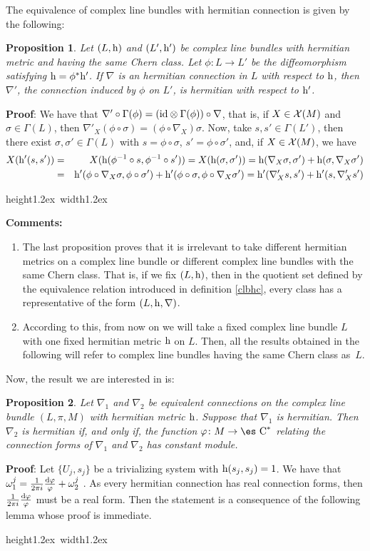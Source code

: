 \documentclass[12pt]{article}
\theoremstyle{plain}
\newtheorem{prop}{Proposition}
\def\beann{\begin{eqnarray*}}
\def\eeann{\end{eqnarray*}}
\def\dst{\(}
\def\qed{\ifvmode\removelastskip\fi
{\unskip\nobreak\hfil\penalty50\hbox{}\nobreak\hfil
\hbox{\vrule height1.2ex width1.2ex}\parfillskip=0pt
\finalhyphendemerits=0 \par\smallskip}}
\def\d{{\rm d}}
\def\h{{\rm h}}
\def\Complex{\mbox{\es C}}
\begin{document}
The equivalence of complex line bundles with
hermitian connection is given by the following:

\begin{prop}
Let $(L,\h )$ and $(L',\h ')$ be complex line bundles
with hermitian metric and having the same Chern class.
Let $\phi \colon L \to L'$ be the diffeomorphism
satisfying $\h = \phi^*\h '$.
If $\nabla$ is an hermitian connection in $L$ with
respect to $\h$, then $\nabla '$,
the connection induced by $\phi$ on $L'$,
is hermitian with respect to $\h '$.
\label{llprim}
\end{prop}
{\bf Proof}: 
We have that
$\nabla ' \circ \Gamma (\phi ) =
({\rm id} \otimes \Gamma (\phi )) \circ \nabla$,
that is, if $X \in {\cal X}(M)$ and
$\sigma \in \Gamma (L)$, then
$\nabla '_X (\phi \circ \sigma ) = (\phi \circ \nabla_X)\sigma$.
Now, take $s,s' \in \Gamma (L')$,
then there exist $\sigma ,\sigma ' \in \Gamma (L)$
with $s = \phi \circ \sigma$,
$s' = \phi \circ \sigma '$,
and, if $X \in {\cal X}(M)$, we have
\beann
X(\h '(s,s'))
&=&
X(\h (\phi^{-1} \circ s,\phi^{-1} \circ s')) =
X(\h (\sigma ,\sigma '))=
\h (\nabla_X \sigma ,\sigma ') + \h (\sigma ,\nabla_X \sigma ')
\\
&=&
\h '(\phi \circ \nabla_X \sigma ,\phi \circ \sigma ') +
\h '(\phi \circ \sigma ,\phi \circ \nabla_X \sigma ')=
\h '(\nabla '_X s,s') + \h '(s,\nabla '_X s')
\eeann
\qed

{\bf Comments:}
\begin{enumerate}
\item
The last proposition proves that it is irrelevant
to take different hermitian metrics on a complex line bundle
or different complex line bundles with the same Chern class.
That is, if we fix $(L,\h )$, then in the quotient set
defined by the equivalence relation introduced in definition
\ref{clbhc},
every class has a representative of the form
$(L,\h ,\nabla )$.
\item
According to this, from now on we will take
a fixed complex line bundle $L$ with one fixed
hermitian metric $\h$ on $L$.
Then, all the results obtained in the following will refer to
complex line bundles having the same Chern class as~$L$.
\end{enumerate}

Now, the result we are interested in is:

\begin{prop}
Let $\nabla_1$ and $\nabla_2$ be equivalent connections on the
complex line bundle $(L,\pi ,M)$ with hermitian metric $\h$.
Suppose that $\nabla _1$ is hermitian. Then $\nabla_2$ is
hermitian if, and only if, the function $\varphi \colon M \to
\Complex^*$ relating the connection forms of $\nabla_1$ and
$\nabla_2$ has constant module. \label{ll}
\end{prop}
{\bf Proof}: 
Let $\{ U_j,s_j \}$ be  a trivializing system
with $\h (s_j,s_j) = 1$.
We have that
\dst \omega^j_1 = \frac{1}{2\pi i}\frac{\d \varphi}{\varphi} +
\omega^j_2\) .
As every hermitian connection has real connection forms,
then \dst\frac{1}{2\pi i}\frac{\d \varphi}{\varphi}\)
must be a real form.
Then the statement is a consequence of the following lemma
whose proof is immediate.
\qed
\end{document}
